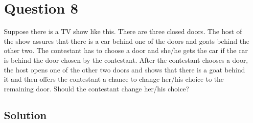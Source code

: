 \section*{Question 8}

Suppose there is a TV show like this. There are three closed doors.
The host of the show assures that there is a car behind one of the doors and goats behind the other two.
The contestant has to choose a door and she/he gets the car if the car is behind the door chosen by the contestant.
After the contestant chooses a door, the host opens one of the other two doors and shows that there is a goat behind it and then offers the contestant a chance to change her/his choice to the remaining door.
Should the contestant change her/his choice?

\subsection*{Solution}
